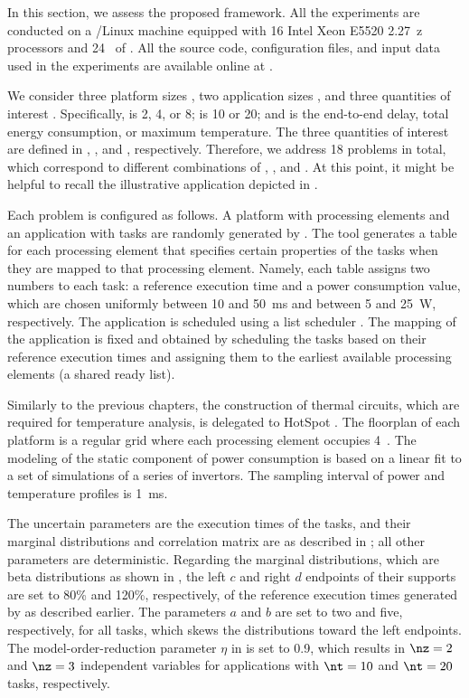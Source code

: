 In this section, we assess the proposed framework. All the experiments are
conducted on a /Linux machine equipped with 16 Intel Xeon E5520
2.27~z processors and 24~ of . All the source code,
configuration files, and input data used in the experiments are available online
at \cite{eslab2017a}.

We consider three platform sizes \np, two application sizes \nt, and three
quantities of interest \g. Specifically, \np is 2, 4, or 8; \nt is 10 or 20; and
\g is the end-to-end delay, total energy consumption, or maximum temperature.
The three quantities of interest are defined in ,
, and , respectively. Therefore, we
address 18 problems in total, which correspond to different combinations of \np,
\nt, and \g. At this point, it might be helpful to recall the illustrative
application depicted in .

Each problem is configured as follows. A platform with \np processing elements
and an application with \nt tasks are randomly generated by 
\cite{dick1998}. The tool generates a table for each processing element that
specifies certain properties of the tasks when they are mapped to that
processing element. Namely, each table assigns two numbers to each task: a
reference execution time and a power consumption value, which are chosen
uniformly between 10 and 50~ms and between 5 and 25~W, respectively. The
application is scheduled using a list scheduler \cite{adam1974}. The mapping of
the application is fixed and obtained by scheduling the tasks based on their
reference execution times and assigning them to the earliest available
processing elements (a shared ready list).

Similarly to the previous chapters, the construction of thermal 
circuits, which are required for temperature analysis, is delegated to HotSpot
\cite{skadron2003}. The floorplan of each platform is a regular grid where each
processing element occupies 4~. The modeling of the static
component of power consumption is based on a linear fit to a set of 
simulations of a series of  invertors. The sampling interval \dt of
power and temperature profiles is 1~ms.

The uncertain parameters \vu are the execution times of the tasks, and their
marginal distributions and correlation matrix are as described in
; all other parameters are deterministic.
Regarding the marginal distributions, which are beta distributions as shown in
, the left $c$ and right $d$ endpoints of their supports
are set to 80\% and 120\%, respectively, of the reference execution times
generated by  as described earlier. The parameters $a$ and $b$ are set
to two and five, respectively, for all tasks, which skews the distributions
toward the left endpoints. The model-order-reduction parameter $\eta$ in
 is set to 0.9, which results in $\nz = 2$ and $\nz
= 3$ independent variables for applications with $\nt = 10$ and $\nt = 20$
tasks, respectively.

